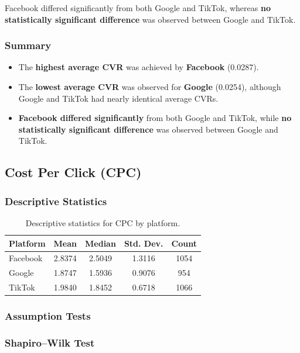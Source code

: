 Facebook differed significantly from both Google and TikTok, whereas \textbf{no statistically significant difference} was observed between Google and TikTok.

\subsubsection{Summary}

\begin{itemize}
	\item The \textbf{highest average CVR} was achieved by \textbf{Facebook} (0.0287).
	\item The \textbf{lowest average CVR} was observed for \textbf{Google} (0.0254), although Google and TikTok had nearly identical average CVRs.
	\item \textbf{Facebook differed significantly} from both Google and TikTok, while \textbf{no statistically significant difference} was observed between Google and TikTok.
\end{itemize}

\subsection{Cost Per Click (CPC)}\label{appendix:platform_performance_analysis_CPC}

\subsubsection{Descriptive Statistics}

\begin{table}[H]
	\centering
	\caption{Descriptive statistics for CPC by platform.}
	\begin{tabular}{lcccc}
		\toprule
		Platform & Mean & Median & Std. Dev. & Count \\
		\midrule
		Facebook & 2.8374 & 2.5049 & 1.3116 & 1054 \\
		Google   & 1.8747 & 1.5936 & 0.9076 & 954 \\
		TikTok   & 1.9840 & 1.8452 & 0.6718 & 1066 \\
		\bottomrule
	\end{tabular}
\end{table}

\subsubsection{Assumption Tests}

\subsubsection{Shapiro--Wilk Test}

